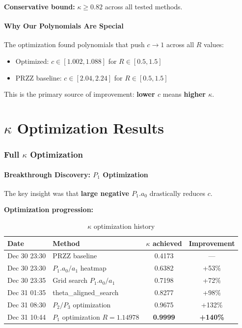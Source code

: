 \documentclass[11pt]{article}
\begin{document}
\textbf{Conservative bound:} $\kappa \geq 0.82$ across all tested methods.

\subsection{Why Our Polynomials Are Special}

The optimization found polynomials that push $c \to 1$ across all $R$ values:
\begin{itemize}
\item Optimized: $c \in [1.002, 1.088]$ for $R \in [0.5, 1.5]$
\item PRZZ baseline: $c \in [2.04, 2.24]$ for $R \in [0.5, 1.5]$
\end{itemize}

This is the primary source of improvement: \textbf{lower $c$} means \textbf{higher $\kappa$}.


\part{$\kappa$ Optimization Results}

\section{Full $\kappa$ Optimization}
\label{sec:kappa_opt}

\subsection{Breakthrough Discovery: $P_1$ Optimization}

The key insight was that \textbf{large negative $P_1.a_0$} drastically reduces $c$.

\textbf{Optimization progression:}

\begin{table}[h]
\centering
\caption{$\kappa$ optimization history}
\begin{tabular}{llcc}
\toprule
Date & Method & $\kappa$ achieved & Improvement \\
\midrule
Dec 30 23:30 & PRZZ baseline & 0.4173 & --- \\
Dec 30 23:30 & $P_1.a_0/a_1$ heatmap & 0.6382 & +53\% \\
Dec 30 23:35 & Grid search $P_1.a_0/a_1$ & 0.7198 & +72\% \\
Dec 31 01:35 & theta\_aligned\_search & 0.8277 & +98\% \\
Dec 31 08:30 & $P_2/P_3$ optimization & 0.9675 & +132\% \\
Dec 31 10:44 & $P_1$ optimization $R=1.14978$ & \textbf{0.9999} & \textbf{+140\%} \\
\bottomrule
\end{tabular}
\end{table}
\end{document}
